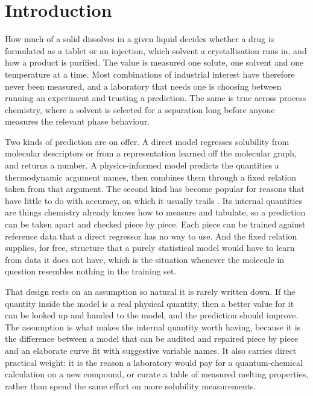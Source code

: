 \section{Introduction}
\label{sec:intro}

How much of a solid dissolves in a given liquid decides whether a drug is formulated as a tablet or
an injection, which solvent a crystallisation runs in, and how a product is purified. The value is
measured one solute, one solvent and one temperature at a time. Most combinations of industrial
interest have therefore never been measured, and a laboratory that needs one is choosing between
running an experiment and trusting a prediction. The same is true across process chemistry, where
a solvent is selected for a separation long before anyone measures the relevant phase behaviour.

Two kinds of prediction are on offer. A direct model regresses solubility from molecular
descriptors or from a representation learned off the molecular graph, and returns a number. A
physics-informed model predicts the quantities a thermodynamic argument names, then combines them
through a fixed relation taken from that argument. The second kind has become popular for reasons
that have little to do with accuracy, on which it usually trails
\cite{osanloo2024,vermeire2022solprop}. Its internal quantities are things chemistry already knows
how to measure and tabulate, so a prediction can be taken apart and checked piece by piece. Each
piece can be trained against reference data that a direct regressor has no way to use. And the
fixed relation supplies, for free, structure that a purely statistical model would have to learn
from data it does not have, which is the situation whenever the molecule in question resembles
nothing in the training set.

That design rests on an assumption so natural it is rarely written down. If the quantity inside the
model is a real physical quantity, then a better value for it can be looked up and handed to the
model, and the prediction should improve. The assumption is what makes the internal quantity worth
having, because it is the difference between a model that can be audited and repaired piece by
piece and an elaborate curve fit with suggestive variable names. It also carries direct practical
weight: it is the reason a laboratory would pay for a quantum-chemical calculation on a new
compound, or curate a table of measured melting properties, rather than spend the same effort on
more solubility measurements.

